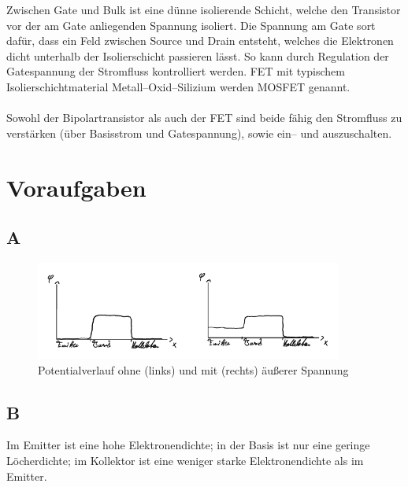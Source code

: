 \documentclass[a4paper,10pt]{article}
\numberwithin{equation}{section}
\begin{document}
Zwischen Gate und Bulk ist eine dünne isolierende Schicht, welche den Transistor vor der am Gate anliegenden Spannung isoliert.
Die Spannung am Gate sort dafür, dass ein Feld zwischen Source und Drain entsteht, welches die Elektronen dicht unterhalb der Isolierschicht passieren lässt.
So kann durch Regulation der Gatespannung der Stromfluss kontrolliert werden.
FET mit typischem Isolierschichtmaterial Metall--Oxid--Silizium werden MOSFET genannt.
\\\\ Sowohl der Bipolartransistor als auch der FET sind beide fähig den Stromfluss zu verstärken (über Basisstrom und Gatespannung), sowie ein-- und auszuschalten.


\clearpage
\section{Voraufgaben}
\subsection{A}
\begin{figure}[h]
        \centering
        \includegraphics[width=0.9\textwidth]{A_crop.pdf}
        \caption[Potentialverlauf ohne und mit äußerer Spannung]{Potentialverlauf ohne (links) und mit (rechts) äußerer Spannung}
\end{figure}

\subsection{B}
Im Emitter ist eine hohe Elektronendichte; in der Basis ist nur eine geringe Löcherdichte; im Kollektor ist eine weniger starke Elektronendichte als im Emitter.
\end{document}
